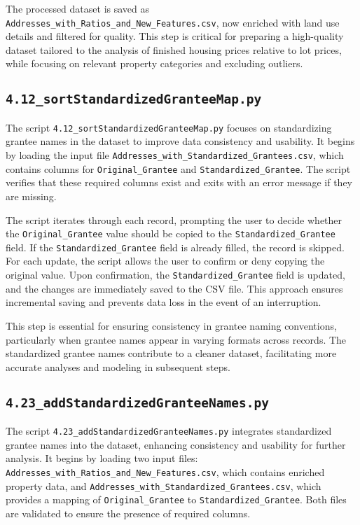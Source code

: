 The processed dataset is saved as \texttt{Addresses\_with\_Ratios\_and\_New\_Features.csv}, now enriched with land use details and filtered for quality. This step is critical for preparing a high-quality dataset tailored to the analysis of finished housing prices relative to lot prices, while focusing on relevant property categories and excluding outliers.

\subsection{\texttt{4.12\_sortStandardizedGranteeMap.py}}

The script \texttt{4.12\_sortStandardizedGranteeMap.py} focuses on standardizing grantee names in the dataset to improve data consistency and usability. It begins by loading the input file \texttt{Addresses\_with\_Standardized\_Grantees.csv}, which contains columns for \texttt{Original\_Grantee} and \texttt{Standardized\_Grantee}. The script verifies that these required columns exist and exits with an error message if they are missing.

The script iterates through each record, prompting the user to decide whether the \texttt{Original\_Grantee} value should be copied to the \texttt{Standardized\_Grantee} field. If the \texttt{Standardized\_Grantee} field is already filled, the record is skipped. For each update, the script allows the user to confirm or deny copying the original value. Upon confirmation, the \texttt{Standardized\_Grantee} field is updated, and the changes are immediately saved to the CSV file. This approach ensures incremental saving and prevents data loss in the event of an interruption.

This step is essential for ensuring consistency in grantee naming conventions, particularly when grantee names appear in varying formats across records. The standardized grantee names contribute to a cleaner dataset, facilitating more accurate analyses and modeling in subsequent steps.

\subsection{\texttt{4.23\_addStandardizedGranteeNames.py}}

The script \texttt{4.23\_addStandardizedGranteeNames.py} integrates standardized grantee names into the dataset, enhancing consistency and usability for further analysis. It begins by loading two input files: \texttt{Addresses\_with\_Ratios\_and\_New\_Features.csv}, which contains enriched property data, and \texttt{Addresses\_with\_Standardized\_Grantees.csv}, which provides a mapping of \texttt{Original\_Grantee} to \texttt{Standardized\_Grantee}. Both files are validated to ensure the presence of required columns.

